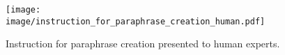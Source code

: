 \begin{figure}[t]
 \centering
  \texttt{[image: image/instruction\_for\_paraphrase\_creation\_human.pdf]}
 \caption{Instruction for paraphrase creation presented to human experts.}
 \label{fig:instruction_for_paraphrase_creation_human}
\end{figure}